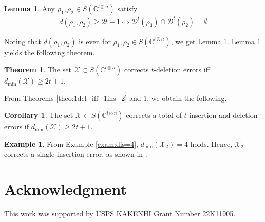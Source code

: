 \documentclass[reprint,amsmath,amssymb,aps,]{revtex4-2}
\theoremstyle{definition}
\newtheorem{exam}{Example}
\newtheorem{lem}{Lemma}
\newtheorem{theo}{Theorem}
\newtheorem{coro}{Corollary}
\newcommand{\SET}[1]{\mathbb{#1}}
\newcommand{\C}{\SET{C}}
\newcommand{\1}{\mbox{1}\hspace{-0.25em}\mbox{l}}%
\newcommand{\pure}[2]{\C^{#1 \otimes #2}}
\newcommand{\state}[2]{S(\pure{#1}{#2})}
\newcommand{\QU}[1]{\mathcal{#1}}
\begin{document}
\begin{lem}
  \label{lem:1del_iff_1ins_1}
  Any $\rho_1, \rho_2 \in \state{l}{n}$ satisfy
  \begin{align*}
    d(\rho_1,\rho_2)
    \ge
    2t+1
    \iff
    \QU{D}^t(\rho_1) \cap \QU{D}^t(\rho_2) = \emptyset
  \end{align*}
\end{lem}
Noting that
$d(\rho_1,\rho_2)$
is
even
for $\rho_1,\rho_2 \in \state{l}{n}$,
we get
Lemma \ref{lem:1del_iff_1ins_1}.
Lemma \ref{lem:1del_iff_1ins_1} yields the following theorem.

\begin{theo}
  \label{theo:1del_iff_1ins_1}
  The set $\QU{X} \subset \state{l}{n}$
  corrects
  $t$-deletion errors
  iff $d_{\text{min}}(\QU{X}) \ge 2t+1$.
\end{theo}

From Theorems \ref{theo:1del_iff_1ins_2} and \ref{theo:1del_iff_1ins_1},
we obtain the following.

\begin{coro}
  The set $\QU{X} \subset \state{l}{n}$
  corrects
  a total of $t$ insertion and deletion errors
  if $d_{\text{min}}(\QU{X}) \ge 2t+1$.
\end{coro}

\begin{exam}
  From Example \ref{exam:dis=4},
  $d_{\text{min}}(\QU{X}_2) =4$ holds.
  Hence,
  $\QU{X}_2$
  corrects
  a single insertion error,
  as shown in \cite{hagiwara2021four}.
\end{exam}

\section*{Acknowledgment}
This work was supported by USPS KAKENHI Grant Number 22K11905.

%



\end{document}
